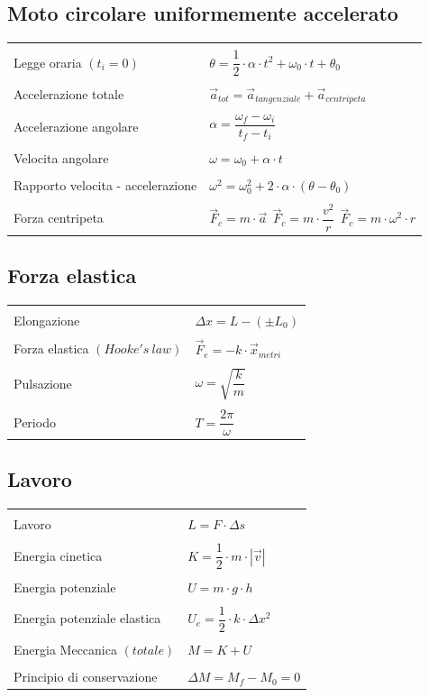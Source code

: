 \documentclass[11pt]{article}
\def\nt{\\[3mm]\hline\\[-2mm]}
\def\nnt{\hline\\[-2mm]}
\def\tnn{\\[2mm]\hline}
\begin{document}
\subsection{Moto circolare uniformemente accelerato}

\begin{tabular}{| p{9.5cm} | p{9.5cm} |}
\nnt
Legge oraria $(t_i = 0)$ & \texttt{$\theta = \dfrac12 \cdot \alpha \cdot t^2 + \omega_0 \cdot t + \theta_0$} \nt
Accelerazione totale & \texttt{$\vec{a}_{tot} = \vec{a}_{tangenziale} + \vec{a}_{centripeta}$} \nt
Accelerazione angolare & \texttt{$\alpha = \dfrac{\omega_f - \omega_i}{t_f - t_i}$} \nt
Velocita angolare & \texttt{$\omega = \omega_0 + \alpha \cdot t$} \nt
Rapporto velocita - accelerazione & \texttt{$\omega^2 = \omega_0^2 + 2 \cdot \alpha \cdot (\theta - \theta_0)$} \nt
Forza centripeta & \texttt{$\vec{F}_c = m \cdot \vec{a}\ \ \vec{F}_c = m \cdot \dfrac{v^2}{r}\ \ \vec{F}_c = m \cdot \omega^2 \cdot r$} \tnn

\end{tabular}

\subsection{Forza elastica}

\begin{tabular}{| p{9.5cm} | p{9.5cm} |}
\nnt
Elongazione & \texttt{$\Delta x = L - (\pm L_0)$} \nt
Forza elastica $(Hooke's\ law)$ & \texttt{$\vec{F}_e = -k \cdot \vec{x}_{metri}$} \nt
Pulsazione & \texttt{$\omega = \sqrt{\dfrac{k}{m}}$} \nt
Periodo & \texttt{$T = \dfrac{2\pi}{\omega}$}
\tnn

\end{tabular}

\subsection{Lavoro}

\begin{tabular}{| p{9.5cm} | p{9.5cm} |}
\nnt
Lavoro & \texttt{$L = F \cdot \Delta s$} \nt
Energia cinetica & \texttt{$K = \dfrac12 \cdot m \cdot |\vec{v}|$} \nt
Energia potenziale & \texttt{$U = m \cdot g \cdot h$} \nt
Energia potenziale elastica & \texttt{$U_e = \dfrac12 \cdot k \cdot \Delta x^2$} \nt
Energia Meccanica $(totale)$ & \texttt{$M = K + U$} \nt
Principio di conservazione & \texttt{$\Delta M = M_f - M_0 = 0$} \tnn
\end{tabular}
\end{document}
